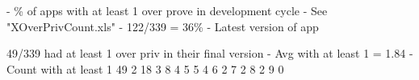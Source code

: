 \documentclass{sig-alternate}
\begin{document}




%










- \% of apps with at least 1 over prove in development cycle - See "XOverPrivCount.xls"
- 122/339 = 36\%
- Latest version of app



49/339 had at least 1 over priv in their final version
-	Avg with at least 1 = 1.84
-	
Count with at least	1	49
				2	18
				3	8
				4	5
				5	4
				6	2
				7	2
				8	2
				9	0



% 













% 

		
		
		











\end{document}
